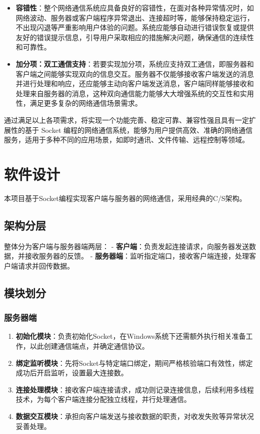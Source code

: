 \documentclass{article}
\begin{document}
\begin{enumerate}
\begin{itemize}
		\item \textbf{容错性}：整个网络通信系统应具备良好的容错性，在面对各种异常情况时，如网络波动、服务器或客户端程序异常退出、连接超时等，能够保持稳定运行，不出现闪退等严重影响用户体验的问题。系统应能够自动进行错误恢复或提供友好的错误提示信息，引导用户采取相应的措施解决问题，确保通信的连续性和可靠性。
		\item \textbf{加分项：双工通信支持}：若要实现加分项，系统应支持双工通信，即服务器和客户端之间能够实现双向的信息交互。服务器不仅能够接收客户端发送的消息并进行处理和响应，还应能够主动向客户端发送消息，客户端同样能够接收和处理来自服务器的消息，这种双向通信能力能够大大增强系统的交互性和实用性，满足更多复杂的网络通信场景需求。
	\end{itemize}
\end{enumerate}

通过满足以上各项需求，将实现一个功能完善、稳定可靠、兼容性强且具有一定扩展性的基于 Socket 编程的网络通信系统，能够为用户提供高效、准确的网络通信服务，适用于多种不同的应用场景，如即时通讯、文件传输、远程控制等领域。

\section{软件设计}
本项目基于Socket编程实现客户端与服务器的网络通信，采用经典的C/S架构。

\subsection{架构分层}
整体分为客户端与服务器端两层：
- \textbf{客户端}：负责发起连接请求，向服务器发送数据，并接收服务器的反馈。
- \textbf{服务器端}：监听指定端口，接收客户端连接，处理客户端请求并回传数据。

\subsection{模块划分}
\subsubsection{服务器端}
\begin{enumerate}
	\item \textbf{初始化模块}：负责初始化Socket，在Windows系统下还需额外执行相关准备工作，以此创建通信端点，并确定通信协议。
	\item \textbf{绑定监听模块}：先将Socket与特定端口绑定，期间严格核验端口有效性，绑定成功后开启监听，设置最大连接数。
	\item \textbf{连接处理模块}：接收客户端连接请求，成功则记录连接信息，后续利用多线程技术，为每个客户端连接分配独立线程，并行处理通信。
	\item \textbf{数据交互模块}：承担向客户端发送与接收数据的职责，对收发失败等异常状况妥善处理。
\end{enumerate}
\end{document}
